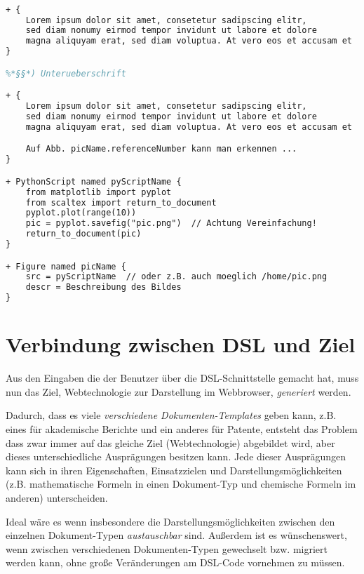 \begin{lstlisting}[language=TeX]
%*§*) Ueberschrift

+ {
    Lorem ipsum dolor sit amet, consetetur sadipscing elitr,
    sed diam nonumy eirmod tempor invidunt ut labore et dolore
    magna aliquyam erat, sed diam voluptua. At vero eos et accusam et
}

%*§§*) Unterueberschrift

+ {
    Lorem ipsum dolor sit amet, consetetur sadipscing elitr,
    sed diam nonumy eirmod tempor invidunt ut labore et dolore
    magna aliquyam erat, sed diam voluptua. At vero eos et accusam et

    Auf Abb. picName.referenceNumber kann man erkennen ...
}

+ PythonScript named pyScriptName {
    from matplotlib import pyplot
    from scaltex import return_to_document
    pyplot.plot(range(10))
    pic = pyplot.savefig("pic.png")  // Achtung Vereinfachung!
    return_to_document(pic)
}

+ Figure named picName {
    src = pyScriptName  // oder z.B. auch moeglich /home/pic.png
    descr = Beschreibung des Bildes
}
\end{lstlisting}


\section{Verbindung zwischen DSL und Ziel}\label{sec-verbindung}

Aus den Eingaben die der Benutzer über die DSL-Schnittstelle gemacht hat,
muss nun das Ziel, Webtechnologie zur Darstellung im
Webbrowser, \emph{generiert} werden.

Dadurch, dass es viele \emph{verschiedene Dokumenten-Templates} geben kann,
z.B. eines für akademische Berichte und ein anderes für Patente, entsteht das
Problem dass zwar immer auf das gleiche Ziel (Webtechnologie) abgebildet
wird, aber dieses unterschiedliche Ausprägungen besitzen kann. Jede
dieser Ausprägungen kann sich in ihren Eigenschaften, Einsatzzielen
und Darstellungsmöglichkeiten (z.B. mathematische Formeln in einen
Dokument-Typ und chemische Formeln im anderen) unterscheiden.

Ideal wäre es wenn insbesondere die Darstellungsmöglichkeiten zwischen
den einzelnen Dokument-Typen \emph{austauschbar} sind. Außerdem ist
es wünschenswert, wenn zwischen verschiedenen Dokumenten-Typen gewechselt
bzw. migriert werden kann, ohne große Veränderungen am DSL-Code vornehmen
zu müssen.

